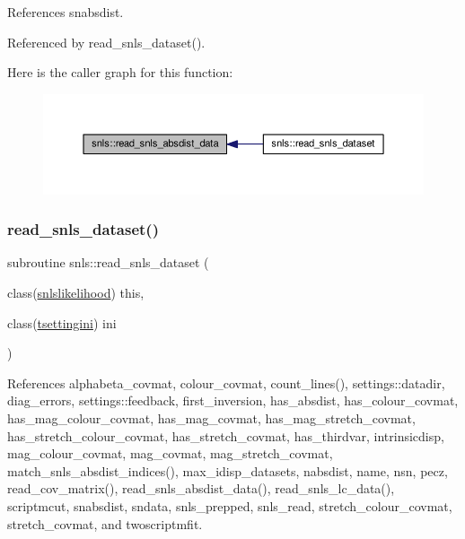 References snabsdist.



Referenced by read\+\_\+snls\+\_\+dataset().

Here is the caller graph for this function\+:
\nopagebreak
\begin{figure}[H]
\begin{center}
\leavevmode
\includegraphics[width=350pt]{namespacesnls_aac6e7755970b914ec53a7e7f2c6ad529_icgraph}
\end{center}
\end{figure}
\mbox{\label{namespacesnls_ae4b5fd7439c0c4620a5d9369c2782c9a}} 
\subsubsection{\texorpdfstring{read\+\_\+snls\+\_\+dataset()}{read\_snls\_dataset()}}
{\footnotesize\ttfamily subroutine snls\+::read\+\_\+snls\+\_\+dataset (\begin{DoxyParamCaption}\item[{class(\mbox{\hyperlink{structsnls_1_1snlslikelihood}{snlslikelihood}})}]{this,  }\item[{class(\mbox{\hyperlink{structsettings_1_1tsettingini}{tsettingini}})}]{ini }\end{DoxyParamCaption})\hspace{0.3cm}{\ttfamily [private]}}



References alphabeta\+\_\+covmat, colour\+\_\+covmat, count\+\_\+lines(), settings\+::datadir, diag\+\_\+errors, settings\+::feedback, first\+\_\+inversion, has\+\_\+absdist, has\+\_\+colour\+\_\+covmat, has\+\_\+mag\+\_\+colour\+\_\+covmat, has\+\_\+mag\+\_\+covmat, has\+\_\+mag\+\_\+stretch\+\_\+covmat, has\+\_\+stretch\+\_\+colour\+\_\+covmat, has\+\_\+stretch\+\_\+covmat, has\+\_\+thirdvar, intrinsicdisp, mag\+\_\+colour\+\_\+covmat, mag\+\_\+covmat, mag\+\_\+stretch\+\_\+covmat, match\+\_\+snls\+\_\+absdist\+\_\+indices(), max\+\_\+idisp\+\_\+datasets, nabsdist, name, nsn, pecz, read\+\_\+cov\+\_\+matrix(), read\+\_\+snls\+\_\+absdist\+\_\+data(), read\+\_\+snls\+\_\+lc\+\_\+data(), scriptmcut, snabsdist, sndata, snls\+\_\+prepped, snls\+\_\+read, stretch\+\_\+colour\+\_\+covmat, stretch\+\_\+covmat, and twoscriptmfit.

